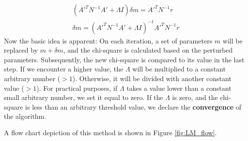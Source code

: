 \documentclass[12pt, TexShade, letterpaper]{report}
\begin{document}
\begin{gather}
    \left(A'^{T} N^{-1}A' + \Lambda I\right)\delta m = A'^T N^{-1} r\\
    \delta m = \left(A'^{T} N^{-1}A' + \Lambda I\right)^{-1} A'^T N^{-1} r \label{eq:LM}
\end{gather}
Now the basic idea is apparent: On each iteration, a set of parameters $m$ will be replaced by $m+\delta m$, and the chi-square is calculated based on the perturbed parameters. Subsequently, the new chi-square is compared to its value in the last step. If we encounter a higher value, the $\Lambda$ will be multiplied to a constant arbitrary number ($>1$). Otherwise, it will be divided with another constant value ($>1$). For practical purposes, if $\Lambda$ takes a value lower than a constant small arbitrary number, we set it equal to zero. If the $\Lambda$ is zero, and the chi-square is less than an arbitrary threshold value, we declare the \textbf{convergence} of the algorithm.\par
A flow chart depiction of this method is shown in Figure \ref{fig:LM_flow}.
\end{document}
